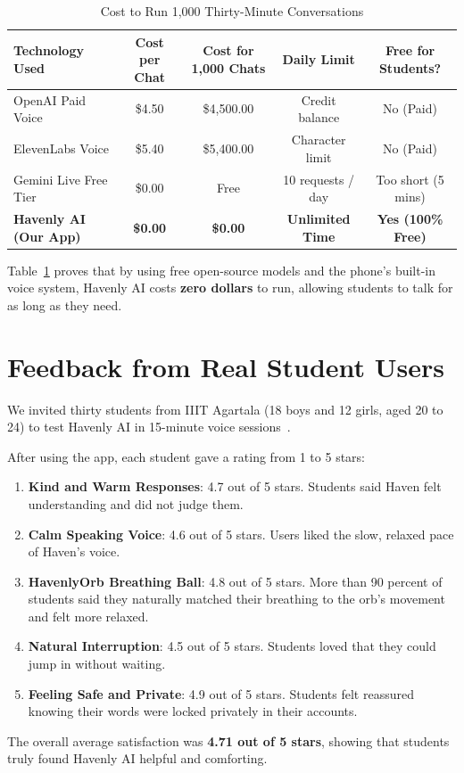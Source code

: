 \begin{table}[ht]
\centering
\caption{Cost to Run 1,000 Thirty-Minute Conversations}
\label{tab:economic_analysis}
\begin{tabularx}{\textwidth}{lcccc}
\toprule
\textbf{Technology Used} & \textbf{Cost per Chat} & \textbf{Cost for 1,000 Chats} & \textbf{Daily Limit} & \textbf{Free for Students?} \\
\midrule
OpenAI Paid Voice & \$4.50 & \$4,500.00 & Credit balance & No (Paid) \\
ElevenLabs Voice & \$5.40 & \$5,400.00 & Character limit & No (Paid) \\
Gemini Live Free Tier & \$0.00 & Free & 10 requests / day & Too short (5 mins) \\
\textbf{Havenly AI (Our App)} & \textbf{\$0.00} & \textbf{\$0.00} & \textbf{Unlimited Time} & \textbf{Yes (100\% Free)} \\
\bottomrule
\end{tabularx}
\end{table}

Table~\ref{tab:economic_analysis} proves that by using free open-source models and the phone's built-in voice system, Havenly AI costs \textbf{zero dollars} to run, allowing students to talk for as long as they need.

\section{Feedback from Real Student Users}
\label{sec:eval_qualitative}

We invited thirty students from IIIT Agartala (18 boys and 12 girls, aged 20 to 24) to test Havenly AI in 15-minute voice sessions~\cite{kroenke2009phq4}. 

After using the app, each student gave a rating from 1 to 5 stars:
\begin{enumerate}
    \item \textbf{Kind and Warm Responses}: 4.7 out of 5 stars. Students said Haven felt understanding and did not judge them.
    \item \textbf{Calm Speaking Voice}: 4.6 out of 5 stars. Users liked the slow, relaxed pace of Haven's voice.
    \item \textbf{HavenlyOrb Breathing Ball}: 4.8 out of 5 stars. More than 90 percent of students said they naturally matched their breathing to the orb's movement and felt more relaxed.
    \item \textbf{Natural Interruption}: 4.5 out of 5 stars. Students loved that they could jump in without waiting.
    \item \textbf{Feeling Safe and Private}: 4.9 out of 5 stars. Students felt reassured knowing their words were locked privately in their accounts.
\end{enumerate}

The overall average satisfaction was \textbf{4.71 out of 5 stars}, showing that students truly found Havenly AI helpful and comforting.
